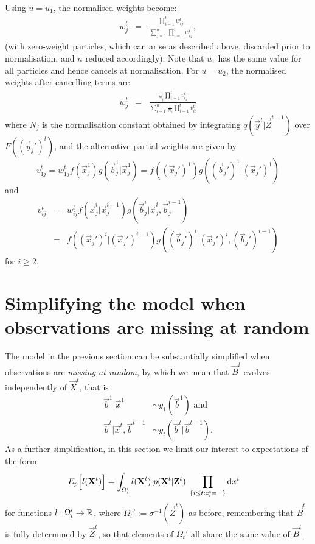 Using $u = u_1$, the normalised weights become:
\begin{eqnarray*}
w^{t}_j &=& \frac{\prod_{i=1}^t w^{t}_{ij}}{\sum_{j=1}^n \prod_{i=1}^t w^{t}_{ij}},
\end{eqnarray*}
(with zero-weight particles, which can arise as described above, discarded prior to normalisation, and $n$ reduced accordingly). Note that $u_1$ has the same value for all particles and hence cancels at normalisation.
For $u = u_2$, the normalised weights after cancelling terms are
\begin{eqnarray*}
w^{t}_j &=& \frac{\frac{1}{N_j} \prod_{i=1}^t v^{t}_{ij}}{\sum_{l=1}^n \frac{1}{N_l}\prod_{i=1}^t v^{t}_{il}}
\end{eqnarray*}
where $N_j$ is the normalisation constant obtained by integrating $q(\vec{y}^{t} | \vec{Z}^{t-1})$ over $F((\vec{y}_j')^{t})$, and the alternative partial weights are given by
\[
v^{t}_{1j} = w^{t}_{1j} f(\vec{x}_j^1)g(\vec{b}_j^1 | \vec{x}_j^1) = f((\vec{x}_j')^1)g((\vec{b}_j')^1 | (\vec{x}_j')^1)
\]
and
\begin{eqnarray*}
v^{t}_{ij} &=& w^{t}_{ij} f(\vec{x}_j^i | \vec{x}_j^{i-1}) g(\vec{b}_j^i | \vec{x}_j^i, \vec{b}_j^{i-1}) \\
&=& f((\vec{x}_j')^i | (\vec{x}_j')^{i-1}) g((\vec{b}_j')^i | (\vec{x}_j')^i, (\vec{b}_j')^{i-1})
\end{eqnarray*}
for $i \geq 2$. 




\section{Simplifying the model when observations are missing at random}

The model in the previous section can be substantially simplified when observations are {\em missing at random}, by which we mean that $\vec{B}^t$ evolves independently of $\vec{X}^t$, that is 
\begin{align*}
    \vec{b}^1 | \vec{x}^1 &\sim g_1(\vec{b}^1 ) \mbox{ and } \\
    \vec{b}^t | \vec{x}^t, \vec{b}^{t-1} &\sim g_t(\vec{b}^t | \vec{b}^{t-1}).
\end{align*}
As a further simplification, in this section we limit our interest to expectations of the form:
\begin{align*}
    E_{p} \Big[l(\mathbf{X}^{t}) \Big] &=  \int_{\Omega_t'} l(\mathbf{X}^{t})\; p(\mathbf{X}^{t} | \mathbf{Z}^{t})\; \prod_{ \{ i \leq t  : z^t_{i} = - \} } \operatorname{d}\!{x}^i
\end{align*}
for functions $l: \Omega_t'  \rightarrow \mathbb R$, where $\Omega_t' := \sigma^{-1}(\vec{Z}^{t})$ as before, remembering that $\vec{B}^{t}$ is fully determined by $\vec{Z}^{t}$, so that elements of $\Omega_t'$ all share the same value of $\vec{B}^{t}$. 

